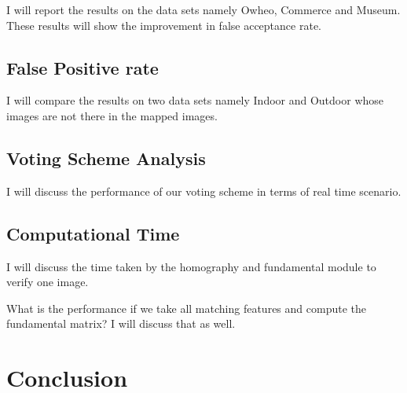 I will report the results on the data sets namely Owheo, 
Commerce and Museum. These results will show the 
improvement in false acceptance rate.


\subsection{False Positive rate}
I will compare the results on two data sets 
namely Indoor and Outdoor whose images 
are not there in the mapped images.

\subsection{Voting Scheme Analysis}
I will discuss the performance of our voting scheme 
in terms of real time scenario.

\subsection{Computational Time}
I will discuss the time taken by the homography and 
fundamental module to verify one image. 

What is the performance if we take all matching features 
and compute the fundamental matrix? I will discuss that as well. 

\section{Conclusion}